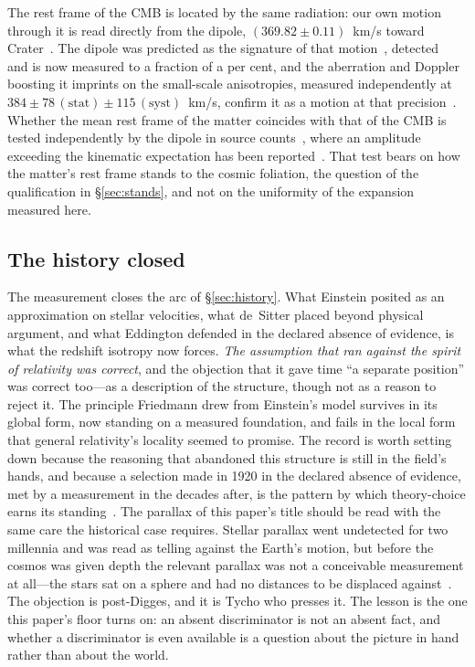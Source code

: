 \documentclass[11pt,a4paper]{article}
\begin{document}
The rest frame of the CMB is located by the same radiation: our own motion through it is read directly from the dipole, $(369.82\pm0.11)$~km/s toward Crater~\cite{Planck2018I}. The dipole was predicted as the signature of that motion~\cite{PeeblesWilkinson1968}, detected~\cite{Smoot1977} and is now measured to a fraction of a per cent, and the aberration and Doppler boosting it imprints on the small-scale anisotropies, measured independently at $384\pm78\,(\mathrm{stat})\pm115\,(\mathrm{syst})$~km/s, confirm it as a motion at that precision~\cite{Planck2013XXVII}. Whether the mean rest frame of the matter coincides with that of the CMB is tested independently by the dipole in source counts~\cite{EllisBaldwin1984}, where an amplitude exceeding the kinematic expectation has been reported~\cite{Secrest2021, Secrest2025}. That test bears on how the matter's rest frame stands to the cosmic foliation, the question of the qualification in \S\ref{sec:stands}, and not on the uniformity of the expansion measured here.

\subsection{The history closed}\label{sec:closed}

The measurement closes the arc of \S\ref{sec:history}. What Einstein posited as an approximation on stellar velocities, what de~Sitter placed beyond physical argument, and what Eddington defended in the declared absence of evidence, is what the redshift isotropy now forces. \emph{The assumption that ran against the spirit of relativity was correct}, and the objection that it gave time ``a separate position'' was correct too---as a description of the structure, though not as a reason to reject it. The principle Friedmann drew from Einstein's model survives in its global form, now standing on a measured foundation, and fails in the local form that general relativity's locality seemed to promise. The record is worth setting down because the reasoning that abandoned this structure is still in the field's hands, and because a selection made in 1920 in the declared absence of evidence, met by a measurement in the decades after, is the pattern by which theory-choice earns its standing~\cite{JanzenShadowExistence}. The parallax of this paper's title should be read with the same care the historical case requires. Stellar parallax went undetected for two millennia and was read as telling against the Earth's motion, but before the cosmos was given depth the relevant parallax was not a conceivable measurement at all---the stars sat on a sphere and had no distances to be displaced against~\cite{JanzenShadowExistence}. The objection is post-Digges, and it is Tycho who presses it. The lesson is the one this paper's floor turns on: an absent discriminator is not an absent fact, and whether a discriminator is even available is a question about the picture in hand rather than about the world.
\end{document}
